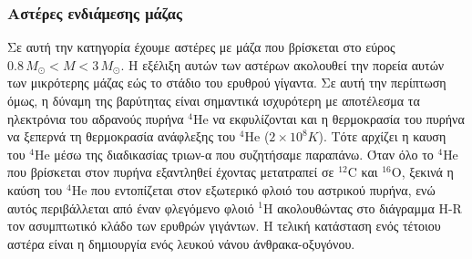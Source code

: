 \subsubsection{Αστέρες ενδιάμεσης μάζας}
Σε αυτή την κατηγορία έχουμε αστέρες με μάζα που βρίσκεται στο εύρος $0.8 \,M_{\odot} < M < 3 \,M_{\odot}$.
H εξέλιξη αυτών των αστέρων ακολουθεί την πορεία αυτών των μικρότερης μάζας εώς το στάδιο του ερυθρού γίγαντα. Σε αυτή την περίπτωση όμως, η δύναμη της βαρύτητας είναι σημαντικά ισχυρότερη με αποτέλεσμα τα ηλεκτρόνια του αδρανούς πυρήνα $^4$He να εκφυλίζονται και η θερμοκρασία του πυρήνα να ξεπερνά τη θερμοκρασία ανάφλεξης του $^4$He ($2\times 10^{8}K$). Τότε αρχίζει η καυση του $^4$He μέσω της διαδικασίας τριων-α που συζητήσαμε παραπάνω. Όταν όλο το $^4$He που βρίσκεται στον πυρήνα εξαντληθεί έχοντας μετατραπεί σε $^{12}$C και $^{16}$O, ξεκινά η καύση του $^4$He που εντοπίζεται στον εξωτερικό φλοιό του αστρικού πυρήνα, ενώ αυτός περιβάλλεται από έναν φλεγόμενο φλοιό $^1$H ακολουθώντας στο διάγραμμα H-R τον ασυμπτωτικό κλάδο των ερυθρών γιγάντων. Η τελική κατάσταση ενός τέτοιου αστέρα είναι η δημιουργία ενός λευκού νάνου άνθρακα-οξυγόνου.

